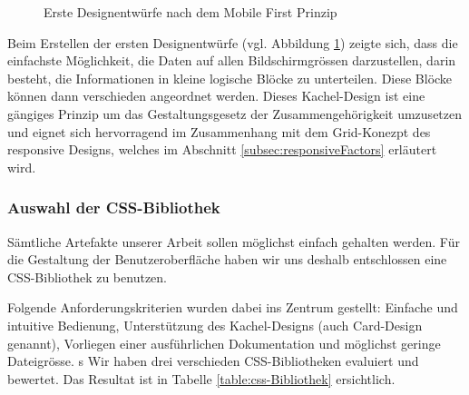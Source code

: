 \begin{figure}[h!]
	\centering
	\caption{Erste Designentwürfe nach dem Mobile First Prinzip}
	\label{img:scribbles}
\end{figure}

Beim Erstellen der ersten Designentwürfe (vgl. Abbildung \ref{img:scribbles}) zeigte sich, dass die einfachste Möglichkeit, die Daten auf allen Bildschirmgrössen darzustellen, darin besteht, die Informationen in kleine logische Blöcke zu unterteilen. Diese Blöcke können dann verschieden angeordnet werden. Dieses Kachel-Design ist eine gängiges Prinzip um das Gestaltungsgesetz der Zusammengehörigkeit umzusetzen und eignet sich hervorragend im Zusammenhang mit dem Grid-Konezpt des responsive Designs, welches im Abschnitt \ref{subsec:responsiveFactors} erläutert wird.


\subsubsection{Auswahl der CSS-Bibliothek}
Sämtliche Artefakte unserer Arbeit sollen möglichst einfach gehalten werden. Für die Gestaltung der Benutzeroberfläche haben wir uns deshalb entschlossen eine CSS-Bibliothek zu benutzen.

Folgende Anforderungskriterien wurden dabei ins Zentrum gestellt:
Einfache und intuitive Bedienung,
Unterstützung des Kachel-Designs (auch Card-Design genannt),
Vorliegen einer ausführlichen Dokumentation und möglichst
geringe Dateigrösse.
s
Wir haben drei verschieden CSS-Bibliotheken evaluiert und bewertet. Das Resultat ist in Tabelle  \ref{table:css-Bibliothek} ersichtlich.


